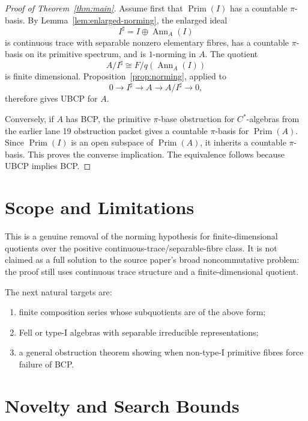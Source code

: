\documentclass[11pt]{article}
\newcommand{\Prim}{\operatorname{Prim}}
\newcommand{\Ann}{\operatorname{Ann}}
\begin{document}
\begin{proof}[Proof of Theorem~\ref{thm:main}]
Assume first that \(\Prim(I)\) has a countable \(\pi\)-basis.  By
Lemma~\ref{lem:enlarged-norming}, the enlarged ideal
\[
        I^\sharp=I\oplus\Ann_A(I)
\]
is continuous trace with separable nonzero elementary fibres, has a countable
\(\pi\)-basis on its primitive spectrum, and is \(1\)-norming in \(A\).  The
quotient
\[
        A/I^\sharp\cong F/q(\Ann_A(I))
\]
is finite dimensional.  Proposition~\ref{prop:norming}, applied to
\[
        0\longrightarrow I^\sharp\longrightarrow A
        \longrightarrow A/I^\sharp\longrightarrow0,
\]
therefore gives UBCP for \(A\).

Conversely, if \(A\) has BCP, the primitive \(\pi\)-base obstruction for
\(C^*\)-algebras from the earlier lane 19 obstruction packet gives a
countable \(\pi\)-basis for \(\Prim(A)\).  Since
\(\Prim(I)\) is an open subspace of \(\Prim(A)\), it inherits a countable
\(\pi\)-basis.  This proves the converse implication.  The equivalence follows
because UBCP implies BCP.
\end{proof}

\section*{Scope and Limitations}

This is a genuine removal of the norming hypothesis for finite-dimensional
quotients over the positive continuous-trace/separable-fibre class.  It is not
claimed as a full solution to the source paper's broad noncommutative problem:
the proof still uses continuous trace structure and a finite-dimensional
quotient.

The next natural targets are:
\begin{enumerate}
    \item finite composition series whose subquotients are of the above form;
    \item Fell or type-I algebras with separable irreducible representations;
    \item a general obstruction theorem showing when non-type-I primitive
          fibres force failure of BCP.
\end{enumerate}

\section*{Novelty and Search Bounds}
\end{document}
